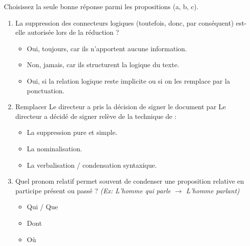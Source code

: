 \documentclass[11pt]{article}
\begin{document}
\begin{exercice}
Choisissez la seule bonne réponse parmi les propositions (a, b, c).
\begin{enumerate}
    \item La suppression des connecteurs logiques (toutefois, donc, par conséquent) est-elle autorisée lors de la réduction ?
    \begin{itemize}
        \item[a)] Oui, toujours, car ils n'apportent aucune information.
        \item[b)] Non, jamais, car ils structurent la logique du texte.
        \item[c)] Oui, si la relation logique reste implicite ou si on les remplace par la ponctuation.
    \end{itemize}
    \item Remplacer \og Le directeur a pris la décision de signer le document \fg{} par \og Le directeur a décidé de signer \fg{} relève de la technique de :
    \begin{itemize}
        \item[a)] La suppression pure et simple.
        \item[b)] La nominalisation.
        \item[c)] La verbalisation / condensation syntaxique.
    \end{itemize}
    \item Quel pronom relatif permet souvent de condenser une proposition relative en participe présent ou passé ? \textit{(Ex: L'homme qui parle $\rightarrow$ L'homme parlant)}
    \begin{itemize}
        \item[a)] Qui / Que
        \item[b)] Dont
        \item[c)] Où
    \end{itemize}
\end{enumerate}
\end{exercice}
\end{document}
